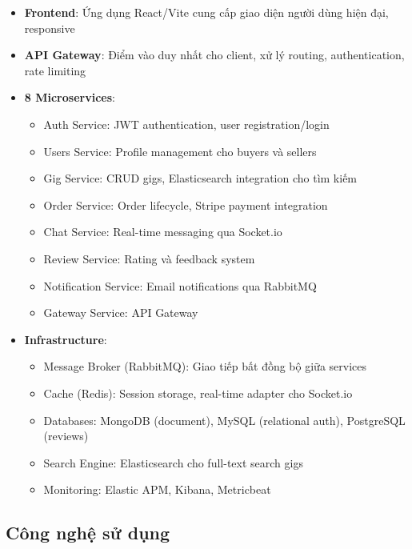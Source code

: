 \documentclass[12pt]{extreport}
\begin{document}
\begin{itemize}
    \item \textbf{Frontend}: Ứng dụng React/Vite cung cấp giao diện người dùng hiện đại, responsive
    \item \textbf{API Gateway}: Điểm vào duy nhất cho client, xử lý routing, authentication, rate limiting
    \item \textbf{8 Microservices}: 
    \begin{itemize}
        \item Auth Service: JWT authentication, user registration/login
        \item Users Service: Profile management cho buyers và sellers
        \item Gig Service: CRUD gigs, Elasticsearch integration cho tìm kiếm
        \item Order Service: Order lifecycle, Stripe payment integration
        \item Chat Service: Real-time messaging qua Socket.io
        \item Review Service: Rating và feedback system
        \item Notification Service: Email notifications qua RabbitMQ
        \item Gateway Service: API Gateway
    \end{itemize}
    \item \textbf{Infrastructure}: 
    \begin{itemize}
        \item Message Broker (RabbitMQ): Giao tiếp bất đồng bộ giữa services
        \item Cache (Redis): Session storage, real-time adapter cho Socket.io
        \item Databases: MongoDB (document), MySQL (relational auth), PostgreSQL (reviews)
        \item Search Engine: Elasticsearch cho full-text search gigs
        \item Monitoring: Elastic APM, Kibana, Metricbeat
    \end{itemize}
\end{itemize}

\subsection{Công nghệ sử dụng}
\end{document}
